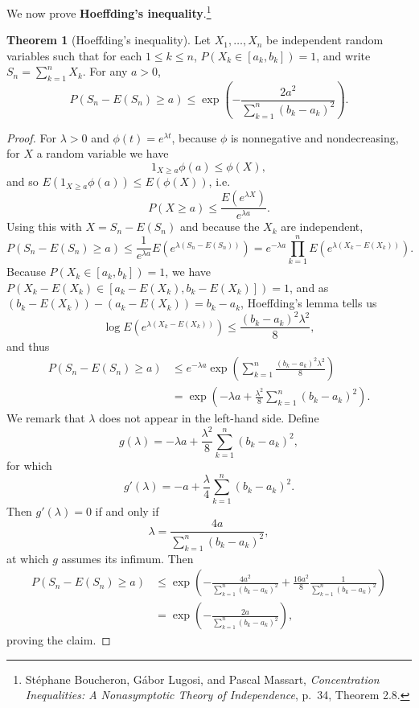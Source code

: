 \documentclass{article}
\theoremstyle{definition}
\newtheorem{theorem}{Theorem}
\theoremstyle{definition}
\begin{document}
We now  prove \textbf{Hoeffding's inequality}.\footnote{St\'ephane Boucheron, G\'abor Lugosi, and
Pascal Massart, {\em Concentration Inequalities: A Nonasymptotic Theory of Independence}, p.~34, Theorem 2.8.}

\begin{theorem}[Hoeffding's inequality]
Let $X_1,\ldots,X_n$ be independent random variables such that for each $1 \leq k \leq n$, 
$P(X_k \in [a_k,b_k])=1$, and write
$S_n=\sum_{k=1}^n X_k$.
For any $a>0$,
\[
P(S_n-E(S_n) \geq a) \leq \exp\left(-\frac{2a^2}{\sum_{k=1}^n (b_k-a_k)^2} \right).
\]
\end{theorem}
\begin{proof}
For $\lambda>0$ 
and  $\phi(t)=e^{\lambda t}$, 
because $\phi$ is nonnegative and nondecreasing, for $X$ a random variable we have
\[
1_{X \geq a} \phi(a) \leq \phi(X),
\]
and so
$E(1_{X \geq a} \phi(a)) \leq E(\phi(X))$, i.e.
\[
P(X \geq a) \leq \frac{E(e^{\lambda X})}{e^{\lambda a}}.
\]
Using this with $X=S_n-E(S_n)$ and because the $X_k$ are independent,
\[
P(S_n-E(S_n) \geq a) \leq \frac{1}{e^{\lambda a}} E(e^{\lambda(S_n-E(S_n))})
=e^{-\lambda a} \prod_{k=1}^n E(e^{\lambda(X_k-E(X_k))}).
\]
Because $P(X_k \in [a_k,b_k])=1$, we have $P(X_k-E(X_k) \in [a_k-E(X_k),b_k-E(X_k)])=1$, and  as
$(b_k-E(X_k))-(a_k-E(X_k))=b_k-a_k$,  Hoeffding's lemma tells us
\[
\log E(e^{\lambda(X_k-E(X_k))}) \leq \frac{(b_k-a_k)^2 \lambda^2}{8},
\]
and thus
\begin{align*}
P(S_n-E(S_n) \geq a)& \leq e^{-\lambda a} \exp\left( \sum_{k=1}^n \frac{(b_k-a_k)^2 \lambda^2}{8} \right)\\
&=\exp\left(-\lambda a + \frac{\lambda^2}{8} \sum_{k=1}^n (b_k-a_k)^2\right).
\end{align*}
We remark that
 $\lambda$ does not appear in the left-hand side. Define
 \[
 g(\lambda) = -\lambda a + \frac{\lambda^2}{8} \sum_{k=1}^n (b_k-a_k)^2,
 \]
 for which 
 \[
 g'(\lambda)=-a + \frac{\lambda}{4} \sum_{k=1}^n(b_k-a_k)^2.
 \]
 Then $g'(\lambda)=0$ if and only if
 \[
\lambda = \frac{4a}{ \sum_{k=1}^n(b_k-a_k)^2},
 \]
 at which $g$ assumes its infimum. Then
 \begin{align*}
 P(S_n-E(S_n) \geq a) &\leq \exp\left( -\frac{4a^2}{\sum_{k=1}^n(b_k-a_k)^2} + \frac{16a^2}{8} \frac{1}{\sum_{k=1}^n(b_k-a_k)^2} \right)\\
 &=\exp\left(-\frac{2a}{\sum_{k=1}^n(b_k-a_k)^2}\right),
 \end{align*}
proving the claim.
\end{proof}
\end{document}
